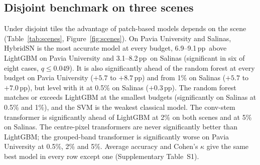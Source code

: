 \documentclass[]{interact}
\newcommand{\pp}{\,pp}
\begin{document}
\subsection{Disjoint benchmark on three scenes}
Under disjoint tiles the advantage of patch-based models depends on the scene (Table~\ref{tab:scenes}, Figure~\ref{fig:scenes}). On Pavia University and Salinas, HybridSN is the most accurate model at every budget, 6.9--9.1\pp\ above LightGBM on Pavia University and 3.1--8.2\pp\ on Salinas (significant in six of eight cases, $q\le0.049$). It is also significantly ahead of the random forest at every budget on Pavia University ($+5.7$ to $+8.7$\pp) and from 1\% on Salinas ($+5.7$ to $+7.0$\pp), but level with it at 0.5\% on Salinas ($+0.3$\pp). The random forest matches or exceeds LightGBM at the smallest budgets (significantly on Salinas at 0.5\% and 1\%), and the SVM is the weakest classical model. The conv-stem transformer is significantly ahead of LightGBM at 2\% on both scenes and at 5\% on Salinas. The centre-pixel transformers are never significantly better than LightGBM; the grouped-band transformer is significantly worse on Pavia University at 0.5\%, 2\% and 5\%. Average accuracy and Cohen's $\kappa$ give the same best model in every row except one (Supplementary Table~S1).
\end{document}

